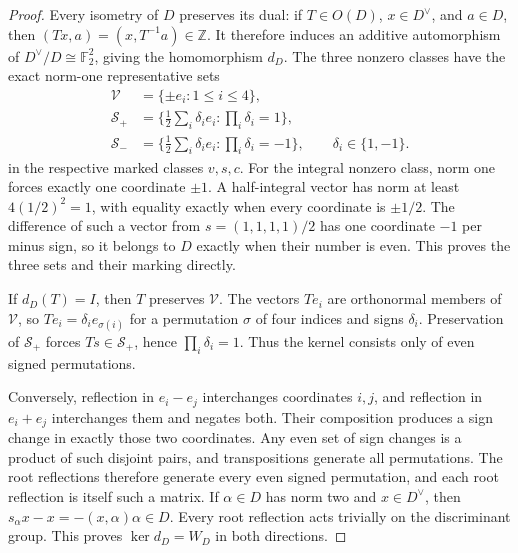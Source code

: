 \begin{proof}
Every isometry of \(D\) preserves its dual: if \(T\in O(D)\),
\(x\in D^\vee\), and \(a\in D\), then
\((Tx,a)=(x,T^{-1}a)\in\mathbb Z\).
It therefore induces an additive automorphism of
\(D^\vee/D\cong\mathbb F_2^2\), giving the homomorphism \(d_D\).
The three nonzero classes have the exact norm-one representative sets
\[
 \begin{aligned}
 \mathcal V&=\{\pm e_i:1\le i\le4\},\\
 \mathcal S_+&=\{\tfrac12\textstyle\sum_i\delta_i e_i:
                                      \prod_i\delta_i=1\},\\
 \mathcal S_-&=\{\tfrac12\textstyle\sum_i\delta_i e_i:
                                      \prod_i\delta_i=-1\},
 \qquad \delta_i\in\{1,-1\}.
 \end{aligned}
\]
in the respective marked classes \(v,s,c\).
For the integral nonzero class, norm one forces exactly one coordinate
\(\pm1\).  A half-integral vector has norm at least
\(4(1/2)^2=1\), with equality exactly when every coordinate is
\(\pm1/2\).  The difference of such a vector from
\(s=(1,1,1,1)/2\) has one coordinate \(-1\) per minus sign,
so it belongs to \(D\) exactly when their number is even.
This proves the three sets and their marking directly.

If \(d_D(T)=I\), then \(T\) preserves \(\mathcal V\).
The vectors \(Te_i\) are orthonormal members of \(\mathcal V\),
so \(Te_i=\delta_i e_{\sigma(i)}\) for a permutation \(\sigma\)
of four indices and signs \(\delta_i\).  Preservation of
\(\mathcal S_+\) forces \(Ts\in\mathcal S_+\), hence
\(\prod_i\delta_i=1\).  Thus the kernel consists only of even
signed permutations.

Conversely, reflection in \(e_i-e_j\) interchanges coordinates
\(i,j\), and reflection in \(e_i+e_j\) interchanges them and
negates both.  Their composition produces a sign change in exactly
those two coordinates.  Any even set of sign changes is a product of
such disjoint pairs, and transpositions generate all permutations.
The root reflections therefore generate every even signed permutation,
and each root reflection is itself such a matrix.  If
\(\alpha\in D\) has norm two and \(x\in D^\vee\), then
\(s_\alpha x-x=-(x,\alpha)\alpha\in D\).  Every root reflection
acts trivially on the discriminant group.  This proves
\(\ker d_D=W_D\) in both directions.


\end{proof}
